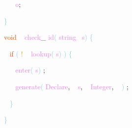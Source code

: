 \documentclass[8, usernames, dvipsnames]{beamer}
\begin{document}
\begin{frame}
\textcolor{White}{\   }
\textcolor{OrangeRed}{	}
\textcolor{White}{\ }
\textcolor{Violet}{o}\textcolor{Sepia}{;}

 \textcolor{SkyBlue}{\} }

 
 
 \textcolor{OrangeRed}{void}
\textcolor{White}{\ }
\textcolor{Violet}{check}\textcolor{Sepia}{\_}
\textcolor{Violet}{id}\textcolor{SkyBlue}{(}
\textcolor{Violet}{string}\textcolor{White}{\ }
\textcolor{Violet}{s}\textcolor{SkyBlue}{)}
\textcolor{SkyBlue}{\{ }

 \textcolor{White}{\   }
\textcolor{OrangeRed}{if}
\textcolor{SkyBlue}{(}
\textcolor{Goldenrod}{!}
\textcolor{White}{\ }
\textcolor{Violet}{lookup}\textcolor{SkyBlue}{(}
\textcolor{Violet}{s}\textcolor{SkyBlue}{)}
\textcolor{SkyBlue}{)}
\textcolor{SkyBlue}{\{ }

 \textcolor{White}{\   }
\textcolor{White}{\   }
\textcolor{Violet}{enter}\textcolor{SkyBlue}{(}
\textcolor{Violet}{s}\textcolor{SkyBlue}{)}
\textcolor{Sepia}{;}

 \textcolor{White}{\   }
\textcolor{White}{\   }
\textcolor{Violet}{generate}\textcolor{SkyBlue}{(}
\textcolor{Violet}{Declare}\textcolor{Sepia}{,}
\textcolor{White}{\ }
\textcolor{Violet}{s}\textcolor{Sepia}{,}
\textcolor{White}{\ }
\textcolor{Violet}{Integer}\textcolor{Sepia}{,}
\textcolor{White}{\ }
\textcolor{SkyBlue}{)}
\textcolor{Sepia}{;}

 \textcolor{White}{\   }
\textcolor{SkyBlue}{\} }

 \textcolor{SkyBlue}{\} }

 \end{frame}
\end{document}
